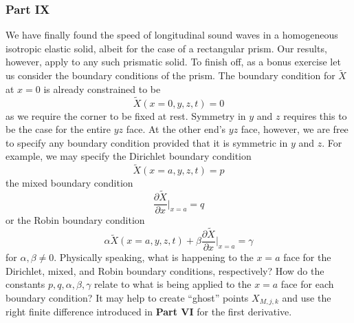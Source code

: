 \documentclass[letterpaper,12pt]{article}
\newcommand*{\pderiv}[2]{\frac{\partial #1}{\partial #2}}
\begin{document}
\begin{flushleft}
    \subsubsection*{Part IX}
    We have finally found the speed of longitudinal sound waves in a homogeneous isotropic elastic solid, albeit for the case of a rectangular prism. Our results, however, apply to any such prismatic solid. To finish off, as a bonus exercise let us consider the boundary conditions of the prism. The boundary condition for $\tilde{X}$ at $x = 0$ is already constrained to be
    $$\tilde{X}(x=0, y, z, t) = 0$$
    as we require the corner to be fixed at rest. Symmetry in $y$ and $z$ requires this to be the case for the entire $yz$ face. At the other end's $yz$ face, however, we are free to specify any boundary condition provided that it is symmetric in $y$ and $z$. For example, we may specify the Dirichlet boundary condition
    $$\tilde{X}(x=a, y, z, t) = p$$
    the mixed boundary condition
    $$\pderiv{\tilde{X}}{x}\bigg|_{x=a} = q$$
    or the Robin boundary condition
    $$\alpha\tilde{X}(x=a, y, z, t) + \beta\pderiv{\tilde{X}}{x}\bigg|_{x=a} = \gamma$$
    for $\alpha, \beta \neq 0$.\newline\newline
    Physically speaking, what is happening to the $x = a$ face for the Dirichlet, mixed, and Robin boundary conditions, respectively? How do the constants $p, q, \alpha, \beta, \gamma$ relate to what is being applied to the $x = a$ face for each boundary condition? It may help to create ``ghost'' points $X_{M,j,k}$ and use the right finite difference introduced in \textbf{Part VI} for the first derivative.

\end{flushleft}
\end{document}
